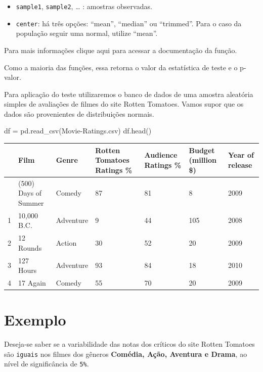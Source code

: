 \documentclass[
  letterpaper,
  DIV=11,
  numbers=noendperiod]{scrreprt}
\newenvironment{Shaded}{\begin{snugshade}}{\end{snugshade}}
\newcommand{\NormalTok}[1]{\textcolor[rgb]{0.00,0.23,0.31}{#1}}
\newcommand{\OperatorTok}[1]{\textcolor[rgb]{0.37,0.37,0.37}{#1}}
\newcommand{\StringTok}[1]{\textcolor[rgb]{0.13,0.47,0.30}{#1}}
\providecommand{\tightlist}{%
  \setlength{\itemsep}{0pt}\setlength{\parskip}{0pt}}\usepackage{longtable,booktabs,array}
\begin{document}
\begin{itemize}
\tightlist
\item
  \texttt{sample1}, \texttt{sample2}, \ldots{} : amostras observadas.
\item
  \texttt{center}: há três opções: ``mean'', ``median'' ou ``trimmed''.
  Para o caso da população seguir uma normal, utilize ``mean''.
\end{itemize}

Para mais informações clique aqui para acessar a documentação da função.

Como a maioria das funções, essa retorna o valor da estatística de teste
e o p-valor.

Para aplicação do teste utilizaremos o banco de dados de uma amostra
aleatória simples de avaliações de filmes do site Rotten Tomatoes. Vamos
supor que os dados são provenientes de distribuições normais.

\begin{Shaded}
\begin{Highlighting}[]
\NormalTok{df }\OperatorTok{=}\NormalTok{ pd.read\_csv(}\StringTok{\textquotesingle{}Movie{-}Ratings.csv\textquotesingle{}}\NormalTok{)}
\NormalTok{df.head()}
\end{Highlighting}
\end{Shaded}

\begin{longtable}[]{@{}lllllll@{}}
\toprule\noalign{}
& Film & Genre & Rotten Tomatoes Ratings \% & Audience Ratings \% &
Budget (million \$) & Year of release \\
\midrule\noalign{}
\endhead
\bottomrule\noalign{}
\endlastfoot
0 & (500) Days of Summer & Comedy & 87 & 81 & 8 & 2009 \\
1 & 10,000 B.C. & Adventure & 9 & 44 & 105 & 2008 \\
2 & 12 Rounds & Action & 30 & 52 & 20 & 2009 \\
3 & 127 Hours & Adventure & 93 & 84 & 18 & 2010 \\
4 & 17 Again & Comedy & 55 & 70 & 20 & 2009 \\
\end{longtable}

\hypertarget{exemplo-4}{%
\section{Exemplo}\label{exemplo-4}}

Deseja-se saber se a variabilidade das notas dos críticos do site Rotten
Tomatoes são \texttt{iguais} nos filmes dos gêneros \textbf{Comédia,
Ação, Aventura e Drama}, ao nível de significância de \texttt{5\%}.
\end{document}
